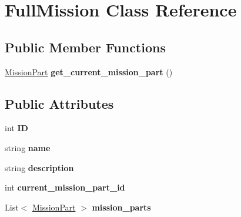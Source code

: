 \hypertarget{class_full_mission}{}\section{Full\+Mission Class Reference}
\label{class_full_mission}
\subsection*{Public Member Functions}
\begin{DoxyCompactItemize}
\item 
\mbox{\label{class_full_mission_a5a90a5adac2d2e1316a4874bf1aca86c}} 
\hyperlink{class_mission_part}{Mission\+Part} {\bfseries get\+\_\+current\+\_\+mission\+\_\+part} ()
\end{DoxyCompactItemize}
\subsection*{Public Attributes}
\begin{DoxyCompactItemize}
\item 
\mbox{\label{class_full_mission_ab5947dac30b18e457de908a355248176}} 
int {\bfseries ID}
\item 
\mbox{\label{class_full_mission_a7907d0de11bfc7527e20b931a6b46749}} 
string {\bfseries name}
\item 
\mbox{\label{class_full_mission_ace9c96214da769c4233207ac64fb5954}} 
string {\bfseries description}
\item 
\mbox{\label{class_full_mission_a534c443b1a75a045823448d0e32b1fee}} 
int {\bfseries current\+\_\+mission\+\_\+part\+\_\+id}
\item 
\mbox{\label{class_full_mission_abef11969217f40de70b464eacaca6433}} 
List$<$ \hyperlink{class_mission_part}{Mission\+Part} $>$ {\bfseries mission\+\_\+parts}
\end{DoxyCompactItemize}
